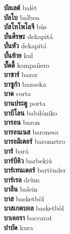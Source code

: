 \textbf{ บัลเลต์  } balèt \\
\textbf{ บัลโบ  } balboa \\
\textbf{ บัสโทโพโลจี  } bùs \\
\textbf{ บั่นศีรษะ  } dekapitá \\
\textbf{ บั่นหัว  } dekapitá \\
\textbf{ บั้นท้าย  } kul \\
\textbf{ บั๊ดดี้  } kompañero \\
\textbf{ บาซาร์  } bazar \\
\textbf{ บาซูก้า  } bazooka \\
\textbf{ บาด  } corta \\
\textbf{ บานประตู  } porta \\
\textbf{ บาบีโลน  } babilóniko \\
\textbf{ บารอน  } baron \\
\textbf{ บารอนเนส  } baronesa \\
\textbf{ บารอมิเตอร์  } barometro \\
\textbf{ บาร์  } bará \\
\textbf{ บาร์บีคิว  } barbekiú \\
\textbf{ บาร์เทนเดอร์  } bartènder \\
\textbf{ บาร์เรล  } drùm \\
\textbf{ บาลีน  } balein \\
\textbf{ บาส  } basketbòl \\
\textbf{ บาสเกตบอล  } basketbòl \\
\textbf{ บาเคอรา  } baccarat \\
\textbf{ บำบัด  } kura \\
